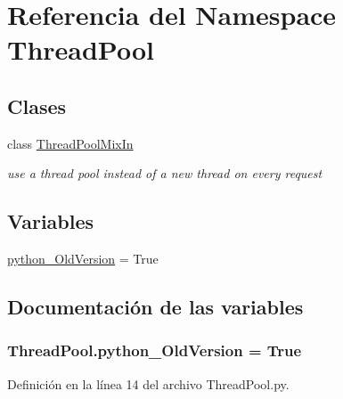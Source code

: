 \hypertarget{namespace_thread_pool}{\section{Referencia del Namespace Thread\-Pool}
\label{namespace_thread_pool}
}
\subsection*{Clases}
\begin{DoxyCompactItemize}
\item 
class \hyperlink{class_thread_pool_1_1_thread_pool_mix_in}{Thread\-Pool\-Mix\-In}
\begin{DoxyCompactList}\small\item\em use a thread pool instead of a new thread on every request \end{DoxyCompactList}\end{DoxyCompactItemize}
\subsection*{Variables}
\begin{DoxyCompactItemize}
\item 
\hyperlink{namespace_thread_pool_ab6ecc6904921422a44cc643ab7cfbd7f}{python\-\_\-\-Old\-Version} = True
\end{DoxyCompactItemize}


\subsection{Documentación de las variables}
\hypertarget{namespace_thread_pool_ab6ecc6904921422a44cc643ab7cfbd7f}{
\subsubsection[{python\-\_\-\-Old\-Version}]{\setlength{\rightskip}{0pt plus 5cm}Thread\-Pool.\-python\-\_\-\-Old\-Version = True}}\label{namespace_thread_pool_ab6ecc6904921422a44cc643ab7cfbd7f}


Definición en la línea 14 del archivo Thread\-Pool.\-py.

